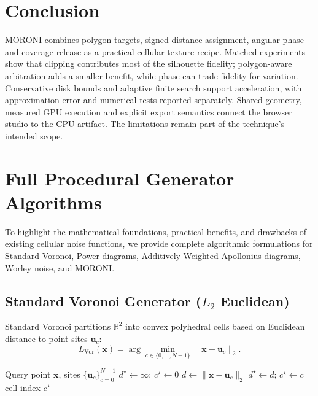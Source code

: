 \documentclass[sigconf,nonacm]{acmart}
\begin{document}
\section{Conclusion}

MORONI combines polygon targets, signed-distance assignment, angular
phase and coverage release as a practical cellular texture recipe. Matched
experiments show that clipping contributes most of the silhouette fidelity;
polygon-aware arbitration adds a smaller benefit, while phase can trade
fidelity for variation. Conservative disk bounds and adaptive finite search
support acceleration, with approximation error and numerical tests reported
separately. Shared geometry, measured GPU execution and explicit export
semantics connect the browser studio to the CPU artifact. The limitations
remain part of the technique's intended scope.




\appendix

\section{Full Procedural Generator Algorithms}
\label{sec:appendix_generators}

To highlight the mathematical foundations, practical benefits, and drawbacks
of existing cellular noise functions, we provide complete algorithmic
formulations for Standard Voronoi, Power diagrams, Additively Weighted
Apollonius diagrams, Worley noise, and MORONI.

\subsection{Standard Voronoi Generator (\texorpdfstring{$L_2$}{L2} Euclidean)}

Standard Voronoi partitions $\mathbb{R}^2$ into convex polyhedral cells based
on Euclidean distance to point sites $\mathbf{u}_c$:
\begin{equation}
L_{\text{Vor}}(\mathbf{x}) = \arg\min_{c \in \{0,\dots,N-1\}} \lVert \mathbf{x} - \mathbf{u}_c \rVert_2.
\end{equation}

\begin{algorithm}[H]
\caption{Standard Voronoi Generator}
\begin{algorithmic}[1]
\Require Query point $\mathbf{x}$, sites $\{\mathbf{u}_c\}_{c=0}^{N-1}$
\State $d^\star \gets \infty$;\; $c^\star \gets 0$
  \State $d \gets \lVert \mathbf{x} - \mathbf{u}_c \rVert_2$
    \State $d^\star \gets d$;\; $c^\star \gets c$
  \EndIf
\EndFor
\State \Return cell index $c^\star$
\end{algorithmic}
\end{algorithm}
\end{document}
